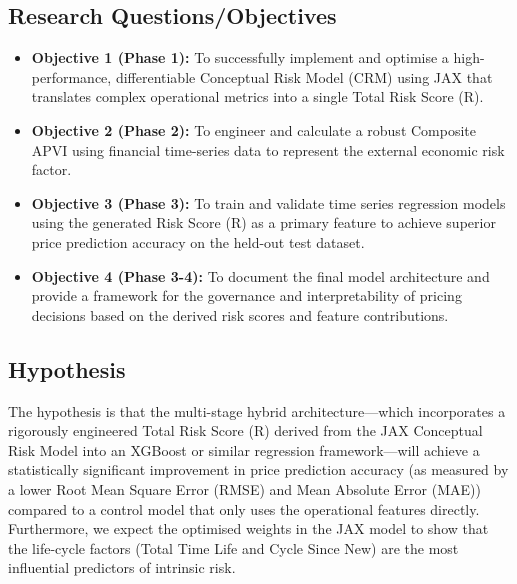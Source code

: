 \documentclass[12pt,a4paper]{article}
\begin{document}
\subsection{Research Questions/Objectives}
\begin{itemize}
    \item \textbf{Objective 1 (Phase 1):} To successfully implement and optimise a high-performance, differentiable Conceptual Risk Model (CRM) using JAX that translates complex operational metrics into a single Total Risk Score (R).
    \item \textbf{Objective 2 (Phase 2):} To engineer and calculate a robust Composite APVI using financial time-series data to represent the external economic risk factor.
    \item \textbf{Objective 3 (Phase 3):} To train and validate time series regression models using the generated Risk Score (R) as a primary feature to achieve superior price prediction accuracy on the held-out test dataset.
    \item \textbf{Objective 4 (Phase 3-4):} To document the final model architecture and provide a framework for the governance and interpretability of pricing decisions based on the derived risk scores and feature contributions.
\end{itemize}

\subsection{Hypothesis}
The hypothesis is that the multi-stage hybrid architecture—which incorporates a rigorously engineered Total Risk Score (R) derived from the JAX Conceptual Risk Model into an XGBoost or similar regression framework—will achieve a statistically significant improvement in price prediction accuracy (as measured by a lower Root Mean Square Error (RMSE) and Mean Absolute Error (MAE)) compared to a control model that only uses the operational features directly. Furthermore, we expect the optimised weights in the JAX model to show that the life-cycle factors (Total Time Life and Cycle Since New) are the most influential predictors of intrinsic risk.

\end{document}
